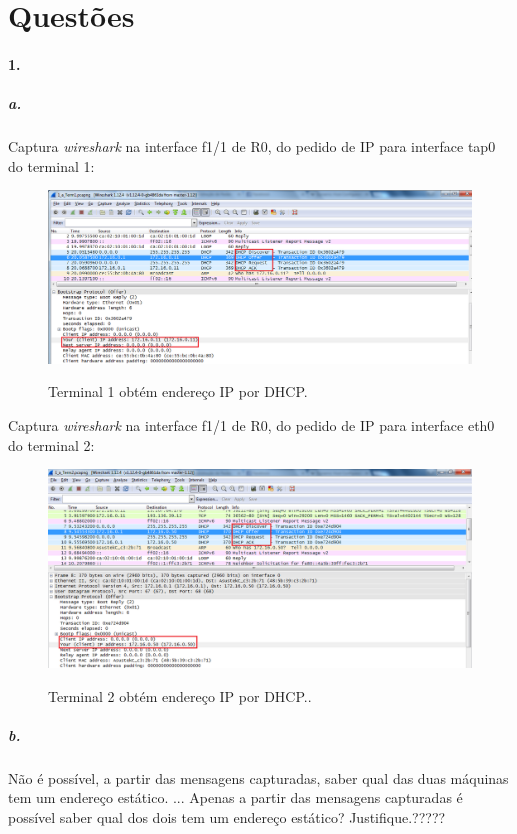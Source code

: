 \section*{Questões}
\paragraph{1.}

\subparagraph{a.}
Captura \emph{wireshark} na interface f1/1 de \textsf{R0}, do pedido de IP para interface \textsf{tap0} do \textsf{terminal 1}:

\begin{figure}[h]
\centering
\includegraphics[width=1\textwidth, height=0.3\textheight]{1_a_Terminal1.png}
\label{fig:Term1 DHCP}
\caption{Terminal 1 obtém endereço IP por DHCP.}
\end{figure}

Captura \emph{wireshark} na interface f1/1 de \textsf{R0}, do pedido de IP para interface \textsf{eth0 } do \textsf{terminal 2}:

\begin{figure}[h]
\centering
\includegraphics[width=1\textwidth, height=0.33\textheight]{1_a_Terminal2.png}
\label{fig:Term2 DHCP}
\caption{Terminal 2 obtém endereço IP por DHCP..}
\end{figure}


\subparagraph{b.}
Não é possível, a partir das mensagens capturadas, saber qual das duas máquinas tem um endereço estático. ...
Apenas a partir das mensagens capturadas é possível saber qual dos dois tem um endereço estático? Justifique.?????


